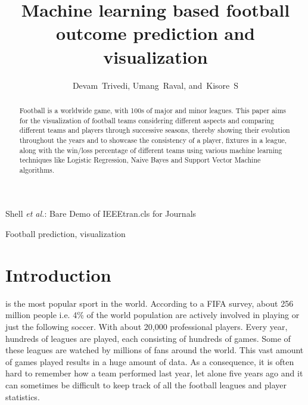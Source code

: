 \documentclass[journal]{IEEEtran}
\begin{document}
\title{Machine learning based football outcome prediction and visualization}


\author{Devam~Trivedi,
        Umang~Raval,
        and~Kisore~S%
}



%
{Shell \MakeLowercase{\textit{et al.}}: Bare Demo of IEEEtran.cls for Journals}

\maketitle

\begin{abstract}
  Football is a worldwide game, with 100s of major and
  minor leagues. This paper aims for the visualization of
  football teams considering different aspects and
  comparing different teams and players through
  successive seasons, thereby showing their evolution
  throughout the years and to showcase the
  consistency of a player, fixtures in a league,
  along with the win/loss percentage of different teams
  using various machine learning techniques like Logistic
  Regression, Naive Bayes and Support Vector Machine algorithms.
\end{abstract}

\begin{IEEEkeywords}
  Football prediction, visualization
\end{IEEEkeywords}

\IEEEpeerreviewmaketitle



\section{Introduction}
 is the most popular sport in the world. According to a FIFA survey, about 256 million people i.e. 4\% of the world population are actively involved in playing or just the following soccer. With about 20,000 professional players. Every year, hundreds of leagues are played, each consisting of hundreds of games. Some of these leagues are watched by millions of fans around the world. This vast amount of games played results in a huge amount of data. As a consequence, it is often hard to remember how a team performed last year, let alone five years ago and it can sometimes be difficult to keep track of all the football leagues and player statistics. 
\end{document}
